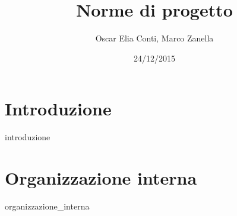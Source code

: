 \documentclass[a4paper,twoside,12pt]{article}
\title{Norme di progetto}
\author{Oscar Elia Conti, Marco Zanella}
\date{24/12/2015}
\begin{document}
\maketitle

\section{Introduzione}
{introduzione}



\section{Organizzazione interna}
{organizzazione_interna}
\end{document}

